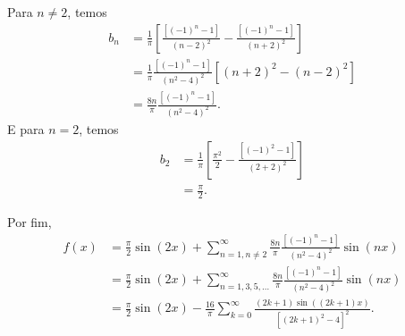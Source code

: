 \documentclass[a4paper,12pt, leqno, answers]{exam}
\begin{document}
\begin{questions}
\begin{solution}
    Para $n \neq 2$, temos
    \begin{align*}
      b_n &= \frac{1}{\pi} \left[ \frac{\left[ (-1)^n - 1 \right]}{\left( n - 2 \right)^2} - \frac{\left[ \left( -1 \right)^n - 1 \right]}{\left( n + 2 \right)^2} \right] \\
      &= \frac{1}{\pi} \frac{\left[ \left( -1 \right)^n - 1 \right]}{\left( n^2 - 4 \right)^2} \left[ \left( n + 2 \right)^2 - \left( n - 2 \right)^2 \right] \\
      &= \frac{8 n}{\pi} \frac{\left[ \left( -1 \right)^n - 1 \right]}{\left( n^2 - 4 \right)^2}.
    \end{align*}
    E para $n = 2$, temos
    \begin{align*}
      b_2 &= \frac{1}{\pi} \left[ \frac{\pi^2}{2} - \frac{\left[ \left( -1 \right)^2 - 1 \right]}{\left( 2 + 2 \right)^2} \right] \\
      &= \frac{\pi}{2}.
    \end{align*}

    Por fim,
    \begin{align*}
      f(x) &= \frac{\pi}{2} \sin\left( 2 x \right) + \sum_{n = 1, n \neq 2}^\infty \frac{8 n}{\pi} \frac{\left[ (-1)^n - 1 \right]}{\left( n^2 - 4 \right)^2} \sin\left( n x \right) \\
      &= \frac{\pi}{2} \sin\left( 2 x \right) + \sum_{n = 1, 3, 5, \ldots}^\infty \frac{8 n}{\pi} \frac{\left[ (-1)^n - 1 \right]}{\left( n^2 - 4 \right)^2} \sin\left( n x \right) \\
      &= \frac{\pi}{2} \sin(2 x) - \frac{16}{\pi} \sum_{k = 0}^\infty \frac{\left( 2 k + 1 \right) \sin\left( \left( 2k + 1 \right) x \right)}{\left[ \left( 2 k + 1 \right)^2 - 4 \right]^2}.
    \end{align*}
    \begin{center}
    \end{center}
  \end{solution}


\end{questions}
\end{document}
